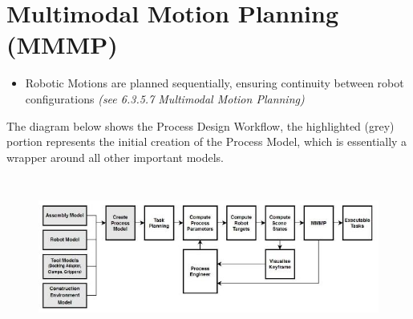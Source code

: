 \documentclass[11pt]{book}
\begin{document}
\section{Multimodal Motion Planning (MMMP)}

\begin{itemize}
\begin{itemize}
	\item Robotic Motions are planned sequentially, ensuring continuity between robot configurations \textit{\textcolor[HTML]{B7B7B7}{(see 6.3.5.7 Multimodal Motion Planning)}}

\end{itemize}
\end{itemize}
The diagram below shows the Process Design Workflow, the highlighted (grey) portion represents the initial creation of the Process Model, which is essentially a wrapper around all other important models. 

\begin{figure}[H]
\includegraphics[width=15.92cm,height=5.26cm]{./images/image16.jpeg}
\end{figure}
\end{document}
